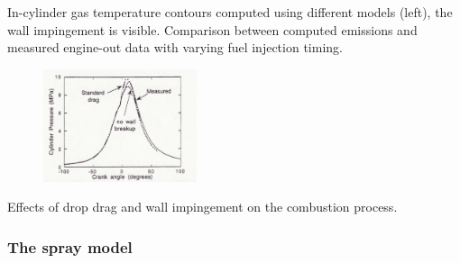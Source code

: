 \documentclass[12pt]{article}
\begin{document}
In-cylinder gas temperature contours computed using different models (left), the wall impingement is visible. Comparison between computed emissions and measured engine-out data with varying fuel injection timing.

\begin{figure}[h!]
\centering
\includegraphics[width=0.4\textwidth]{figures/kiva3.png}
\end{figure}

Effects of drop drag and wall impingement on the combustion process.

\subsubsection{The spray model}
\end{document}
